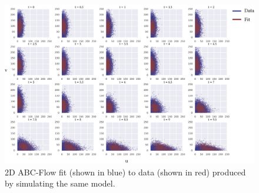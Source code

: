 
\begin{figure}[htbp]
\centering
\includegraphics[scale=0.7]{../../chapters/chapterABCFlow/images/2D_flow_time.png}
\caption[ABC-Flow parameter inference for 2D simulated data]{\label{fig:2d-sim-res}2D ABC-Flow fit (shown in blue) to data (shown in red) produced by simulating the same model. }
\end{figure}

%
%
%
%





